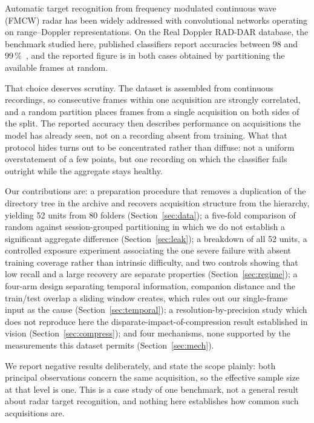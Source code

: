\documentclass[11pt,a4paper]{article}
\begin{document}
Automatic target recognition from frequency modulated continuous wave (FMCW) radar has been widely addressed with convolutional networks operating on range--Doppler representations. On the Real Doppler RAD-DAR database, the benchmark studied here, published classifiers report accuracies between 98 and 99\,\%~\cite{roldan2020,zhang2025}, and the reported figure is in both cases obtained by partitioning the available frames at random.

That choice deserves scrutiny. The dataset is assembled from continuous recordings, so consecutive frames within one acquisition are strongly correlated, and a random partition places frames from a single acquisition on both sides of the split. The reported accuracy then describes performance on acquisitions the model has already seen, not on a recording absent from training. What that protocol hides turns out to be concentrated rather than diffuse: not a uniform overstatement of a few points, but one recording on which the classifier fails outright while the aggregate stays healthy.

Our contributions are: a preparation procedure that removes a duplication of the directory tree in the archive and recovers acquisition structure from the hierarchy, yielding 52 units from 80 folders (Section~\ref{sec:data}); a five-fold comparison of random against session-grouped partitioning in which we do not establish a significant aggregate difference (Section~\ref{sec:leak}); a breakdown of all 52 units, a controlled exposure experiment associating the one severe failure with absent training coverage rather than intrinsic difficulty, and two controls showing that low recall and a large recovery are separate properties (Section~\ref{sec:regime}); a four-arm design separating temporal information, companion distance and the train/test overlap a sliding window creates, which rules out our single-frame input as the cause (Section~\ref{sec:temporal}); a resolution-by-precision study which does not reproduce here the disparate-impact-of-compression result established in vision (Section~\ref{sec:compress}); and four mechanisms, none supported by the measurements this dataset permits (Section~\ref{sec:mech}).

We report negative results deliberately, and state the scope plainly: both principal observations concern the same acquisition, so the effective sample size at that level is one. This is a case study of one benchmark, not a general result about radar target recognition, and nothing here establishes how common such acquisitions are.
\end{document}
